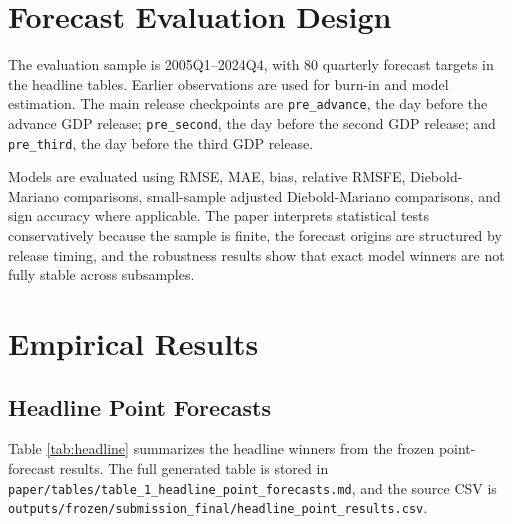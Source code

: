 \documentclass[12pt]{article}
\begin{document}
\section{Forecast Evaluation Design}
\label{sec:evaluation}

The evaluation sample is 2005Q1--2024Q4, with 80 quarterly forecast targets in the headline tables. Earlier observations are used for burn-in and model estimation. The main release checkpoints are \texttt{pre\_advance}, the day before the advance GDP release; \texttt{pre\_second}, the day before the second GDP release; and \texttt{pre\_third}, the day before the third GDP release.

Models are evaluated using RMSE, MAE, bias, relative RMSFE, Diebold-Mariano comparisons, small-sample adjusted Diebold-Mariano comparisons, and sign accuracy where applicable. The paper interprets statistical tests conservatively because the sample is finite, the forecast origins are structured by release timing, and the robustness results show that exact model winners are not fully stable across subsamples.

\section{Empirical Results}
\label{sec:results}

\subsection{Headline Point Forecasts}

Table \ref{tab:headline} summarizes the headline winners from the frozen point-forecast results. The full generated table is stored in \texttt{paper/tables/table\_1\_headline\_point\_forecasts.md}, and the source CSV is \texttt{outputs/frozen/submission\_final/headline\_point\_results.csv}.
\end{document}
